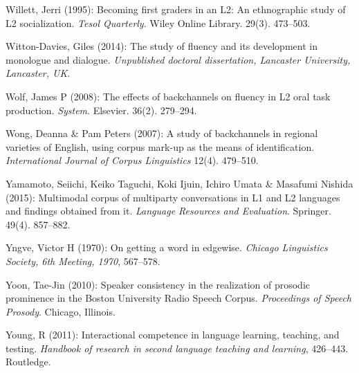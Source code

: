 \begin{styleBibliography}
Willett, Jerri (1995): Becoming first graders in an L2: An ethnographic study of L2 socialization. \textit{Tesol Quarterly}. Wiley Online Library. 29(3). 473–503.
\end{styleBibliography}

\begin{styleBibliography}
Witton-Davies, Giles (2014): The study of fluency and its development in monologue and dialogue. \textit{Unpublished doctoral dissertation, Lancaster University, Lancaster, UK}.
\end{styleBibliography}

\begin{styleBibliography}
Wolf, James P (2008): The effects of backchannels on fluency in L2 oral task production. \textit{System}. Elsevier. 36(2). 279–294.
\end{styleBibliography}

\begin{styleBibliography}
Wong, Deanna \& Pam Peters (2007): A study of backchannels in regional varieties of English, using corpus mark-up as the means of identification. \textit{International Journal of Corpus Linguistics} 12(4). 479–510.
\end{styleBibliography}

\begin{styleBibliography}
Yamamoto, Seiichi, Keiko Taguchi, Koki Ijuin, Ichiro Umata \& Masafumi Nishida (2015): Multimodal corpus of multiparty conversations in L1 and L2 languages and findings obtained from it. \textit{Language Resources and Evaluation}. Springer. 49(4). 857–882.
\end{styleBibliography}

\begin{styleBibliography}
Yngve, Victor H (1970): On getting a word in edgewise. \textit{Chicago Linguistics Society, 6th Meeting, 1970}, 567–578.
\end{styleBibliography}

\begin{styleBibliography}
Yoon, Tae-Jin (2010): Speaker consistency in the realization of prosodic prominence in the Boston University Radio Speech Corpus. \textit{Proceedings of Speech Prosody}. Chicago, Illinois.
\end{styleBibliography}

\begin{styleBibliography}
Young, R (2011): Interactional competence in language learning, teaching, and testing. \textit{Handbook of research in second language teaching and learning}, 426–443. Routledge.
\end{styleBibliography}

